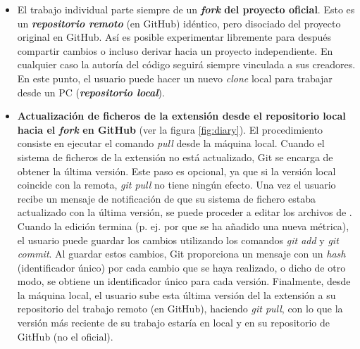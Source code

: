 \begin{itemize}
\item El trabajo individual parte siempre de un \textbf{\textit{fork} del proyecto oficial}. Esto es un \textbf{\textit{repositorio remoto}} (en GitHub) idéntico, pero disociado del proyecto original en GitHub. Así es posible experimentar libremente para después compartir cambios o incluso derivar hacia un proyecto independiente. En cualquier caso la autoría del código seguirá siempre vinculada a sus creadores. En este punto, el usuario puede hacer un nuevo \textit{clone} local para trabajar desde un PC (\textbf{\textit{repositorio local}}).

\item \textbf{Actualización de ficheros de la extensión \pgland{} desde el repositorio local hacia el \textit{fork} en GitHub} (ver la figura \ref{fig:diary}). El procedimiento consiste en ejecutar el comando \textit{pull} desde la máquina local. Cuando el sistema de ficheros de la extensión no está actualizado, Git se encarga de obtener la última versión. Este paso es opcional, ya que si la versión local coincide con la remota, \textit{git pull} no tiene ningún efecto. Una vez el usuario recibe un mensaje de notificación de que su sistema de fichero estaba actualizado con la última versión, se puede proceder a editar los archivos de \pgland{}. Cuando la edición termina (p. ej. por que se ha añadido una nueva métrica), el usuario puede guardar los cambios utilizando los comandos \textit{git add} y \textit{git commit}. Al guardar estos cambios, Git proporciona un mensaje con un \textit{hash} (identificador único) por cada cambio que se haya realizado, o dicho de otro modo, se obtiene un identificador único para cada versión. Finalmente, desde la máquina local, el usuario sube esta última versión del la extensión a su repositorio del trabajo remoto (en GitHub), haciendo \textit{git pull}, con lo que la versión más reciente de su trabajo estaría en local y en su repositorio de GitHub (no el oficial).


\end{itemize}
